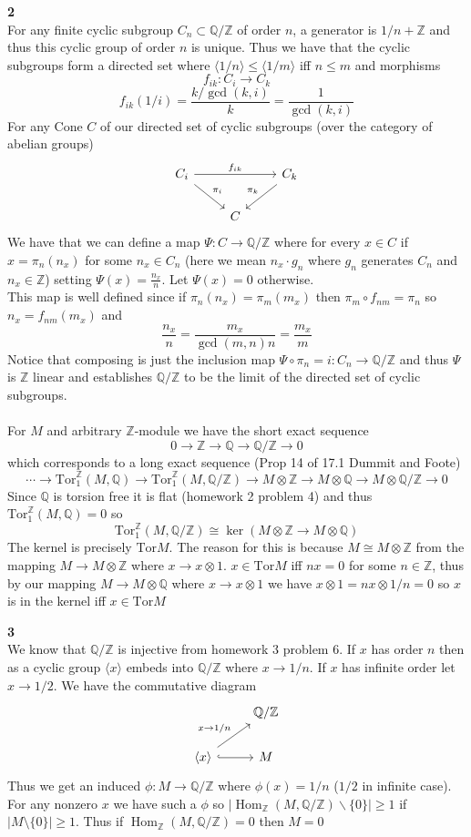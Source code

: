 \documentclass[12pt]{article}
\newenvironment{ques}[1]{\textbf{#1}\vspace{1 mm}\\ }{\bigskip}
\theoremstyle{definition}
\DeclareMathOperator\Hom{Hom}
\newcommand{\Q}{\mathbb Q}
\newcommand{\Z}{\mathbb Z}
\newcommand{\tensor}{\otimes}
\newcommand{\Tor}{\text{Tor}}
\begin{document}
\begin{ques}{2}
	For any finite cyclic subgroup $C_n \subset \Q/\Z$ of order $n$, a
	generator is $1/n + \Z$ and thus this cyclic group of order $n$ is unique.
	Thus we have that the cyclic subgroups form a directed set where
	$\langle 1/n \rangle \leq \langle 1/m \rangle$ iff $n \leq m$ and morphisms 
	$$f_{ik}: C_i \to C_k$$
	$$f_{ik}(1/i) = \frac{k/\gcd(k,i)}{k} = \frac{1}{\gcd(k,i)}$$
	For any Cone $C$ of our directed set of cyclic subgroups (over the category
	of abelian groups)
	$$\begin{tikzcd}
	C_i \arrow[dr, "\pi_i"] \arrow[rr, "f_{ik}"] & & C_k \arrow[dl, "\pi_k"']\\
	& C &
	\end{tikzcd}$$
	We have that we can define a map $\Psi : C \to \Q/\Z$ where for every $x
	\in C$ if $x = \pi_n(n_x)$ for some $n_x \in C_n$ (here we mean $n_x \cdot
	g_n$ where $g_n$ generates $C_n$ and $n_x \in \Z$) setting $\Psi(x) =
	\frac {n_x}{n}$. Let $\Psi(x) = 0$ otherwise.\\
	This map is well defined since if $\pi_n(n_x) = \pi_m(m_x)$ then $\pi_m
	\circ f_{nm} = \pi_n$ so $n_x = f_{nm}(m_x)$ and 
	$$\frac{n_x}{n} = \frac{m_x}{\gcd(m,n)n} = \frac{m_x}{m}$$
	Notice that composing is just the inclusion map $\Psi \circ \pi_n = i : C_n
	\to \Q/\Z$ and thus $\Psi$ is $\Z$ linear and establishes $\Q/\Z$ to be the
	limit of the directed set of cyclic subgroups.
	\\
	\\
	For $M$ and arbitrary $\Z$-module we have the short exact sequence
	$$0 \to \Z \to \Q \to \Q/\Z \to 0$$
	which corresponds to a long exact sequence (Prop 14 of 17.1 Dummit and Foote)
	$$\cdots \to \Tor^\Z_1(M,\Q) \to \Tor^\Z_1(M,\Q/\Z) \to M \tensor \Z \to M
	\tensor \Q \to M \tensor \Q/\Z \to 0$$
	Since $\Q$ is torsion free it is flat (homework 2 problem 4) and thus
	$\Tor^\Z_1(M,\Q) = 0$ so 
	$$\Tor_1^\Z(M, \Q/\Z) \cong \ker (M \tensor \Z \to M \tensor \Q)$$
	The kernel is precisely $\Tor M$. The reason for this is because $M \cong M
	\tensor \Z$  from the mapping $M \to M \tensor \Z $ where $x \to
	x \tensor 1$. $x \in \Tor M$ iff $nx = 0$ for some $n \in \Z$, thus by our
	mapping $M \to M \tensor \Q$ where $x \to x \tensor 1$ we have $x \tensor 1
	= nx \tensor 1/n = 0$ so $x$ is in the kernel iff $x \in \Tor M$
\end{ques}

\begin{ques}{3}
	We know that $\Q/\Z$ is injective from homework 3 problem $6$. If $x$ has
	order $n$ then as a cyclic group $\langle x \rangle$ embeds into $\Q/\Z$
	where $x \to 1/n$. If $x$ has infinite order let $x \to 1/2$. We have the
	commutative diagram
	$$\begin{tikzcd}
	 & \Q/\Z \\
	\langle x \rangle \arrow[ur, "x \to 1/n"] \arrow[r, hook] & M
	\end{tikzcd}$$
	Thus we get an induced $\phi:M \to \Q/\Z$ where $\phi(x) = 1/n$ ($1/2$ in
	infinite case). For any nonzero $x$ we have such a $\phi$ so
	$|\Hom_\Z(M,\Q/\Z) \backslash \{0\}| \geq 1$ if $ |M \setminus \{0\}| \geq
	1$. Thus if $\Hom_\Z(M,\Q/\Z) = 0$ then $M = 0$
\end{ques}
\end{document}
